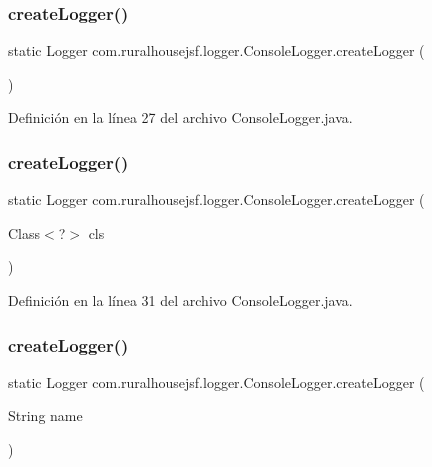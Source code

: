 \subsubsection{\texorpdfstring{createLogger()}{createLogger()}\hspace{0.1cm}{\footnotesize\ttfamily [1/6]}}
{\footnotesize\ttfamily static Logger com.\+ruralhousejsf.\+logger.\+Console\+Logger.\+create\+Logger (\begin{DoxyParamCaption}{ }\end{DoxyParamCaption})\hspace{0.3cm}{\ttfamily [static]}}



Definición en la línea 27 del archivo Console\+Logger.\+java.

\mbox{\label{classcom_1_1ruralhousejsf_1_1logger_1_1_console_logger_a7260bb499fc46999ae7c583aa7227a9e}} 
\subsubsection{\texorpdfstring{createLogger()}{createLogger()}\hspace{0.1cm}{\footnotesize\ttfamily [2/6]}}
{\footnotesize\ttfamily static Logger com.\+ruralhousejsf.\+logger.\+Console\+Logger.\+create\+Logger (\begin{DoxyParamCaption}\item[{Class$<$?$>$}]{cls }\end{DoxyParamCaption})\hspace{0.3cm}{\ttfamily [static]}}



Definición en la línea 31 del archivo Console\+Logger.\+java.

\mbox{\label{classcom_1_1ruralhousejsf_1_1logger_1_1_console_logger_aede603ef1d6e7732ebc86740306a0d76}} 
\subsubsection{\texorpdfstring{createLogger()}{createLogger()}\hspace{0.1cm}{\footnotesize\ttfamily [3/6]}}
{\footnotesize\ttfamily static Logger com.\+ruralhousejsf.\+logger.\+Console\+Logger.\+create\+Logger (\begin{DoxyParamCaption}\item[{String}]{name }\end{DoxyParamCaption})\hspace{0.3cm}{\ttfamily [static]}}



